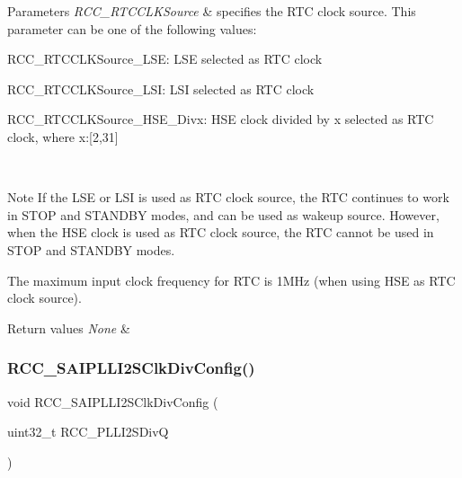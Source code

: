 \begin{DoxyParams}{Parameters}
{\em R\+C\+C\+\_\+\+R\+T\+C\+C\+L\+K\+Source} & specifies the R\+TC clock source. This parameter can be one of the following values\+: \begin{DoxyItemize}
\item R\+C\+C\+\_\+\+R\+T\+C\+C\+L\+K\+Source\+\_\+\+L\+SE\+: L\+SE selected as R\+TC clock \item R\+C\+C\+\_\+\+R\+T\+C\+C\+L\+K\+Source\+\_\+\+L\+SI\+: L\+SI selected as R\+TC clock \item R\+C\+C\+\_\+\+R\+T\+C\+C\+L\+K\+Source\+\_\+\+H\+S\+E\+\_\+\+Divx\+: H\+SE clock divided by x selected as R\+TC clock, where x\+:\mbox{[}2,31\mbox{]}\end{DoxyItemize}
\\
\hline
\end{DoxyParams}
\begin{DoxyNote}{Note}
If the L\+SE or L\+SI is used as R\+TC clock source, the R\+TC continues to work in S\+T\+OP and S\+T\+A\+N\+D\+BY modes, and can be used as wakeup source. However, when the H\+SE clock is used as R\+TC clock source, the R\+TC cannot be used in S\+T\+OP and S\+T\+A\+N\+D\+BY modes. ~\newline


The maximum input clock frequency for R\+TC is 1\+M\+Hz (when using H\+SE as R\+TC clock source).
\end{DoxyNote}

\begin{DoxyRetVals}{Return values}
{\em None} & \\
\hline
\end{DoxyRetVals}
\mbox{\label{group___r_c_c_ga71a887e0e7ef3d49ff87f2cbc435b099}} 
\subsubsection{\texorpdfstring{R\+C\+C\+\_\+\+S\+A\+I\+P\+L\+L\+I2\+S\+Clk\+Div\+Config()}{RCC\_SAIPLLI2SClkDivConfig()}}
{\footnotesize\ttfamily void R\+C\+C\+\_\+\+S\+A\+I\+P\+L\+L\+I2\+S\+Clk\+Div\+Config (\begin{DoxyParamCaption}\item[{uint32\+\_\+t}]{R\+C\+C\+\_\+\+P\+L\+L\+I2\+S\+DivQ }\end{DoxyParamCaption})}



